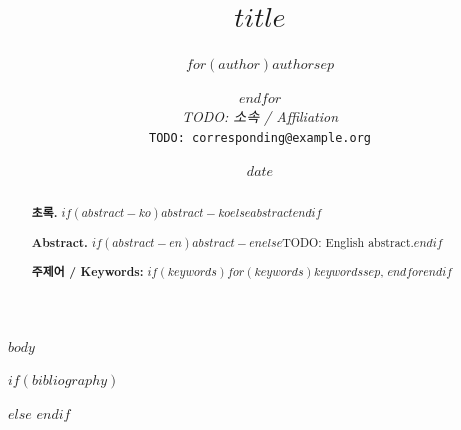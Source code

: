 \documentclass[10pt,a4paper]{article}
\title{$title$}
\author{
  $for(author)$$author$$sep$ \and $endfor$ \\
  \small \textit{TODO: 소속 / Affiliation} \\
  \small \texttt{TODO: corresponding@example.org}
}
\date{$date$}
\begin{document}
\maketitle
\begin{abstract}
  \noindent\textbf{초록.} $if(abstract-ko)$$abstract-ko$$else$$abstract$$endif$

  \medskip
  \noindent\textbf{Abstract.} $if(abstract-en)$$abstract-en$$else$TODO: English abstract.$endif$

  \medskip
  \noindent\textbf{주제어 / Keywords:}
  $if(keywords)$$for(keywords)$$keywords$$sep$, $endfor$$endif$
\end{abstract}
\vspace{1em}

$body$

$if(bibliography)$

$else$
% 
$endif$
\end{document}

